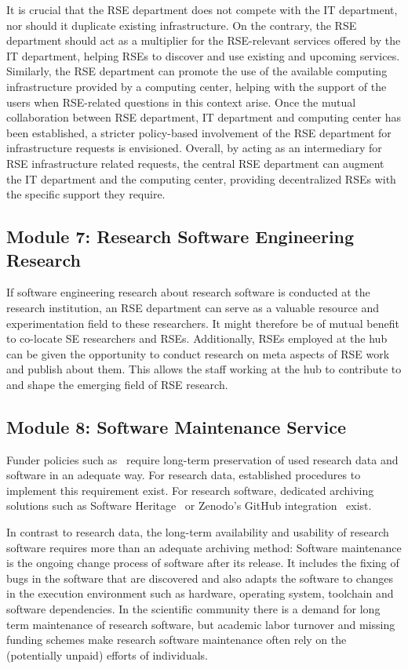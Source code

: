 \documentclass[a4paper]{article}
\begin{document}
It is crucial that the RSE department does not compete with the IT department, nor should it duplicate existing infrastructure.
On the contrary, the RSE department should act as a multiplier for the RSE-relevant services offered by the IT department, helping RSEs to discover and use existing and upcoming services.
Similarly, the RSE department can promote the use of the available computing infrastructure provided by a computing center, helping with the support of the users when RSE-related questions in this context arise.
Once the mutual collaboration between RSE department, IT department and computing center has been established, a stricter policy-based involvement of the RSE department for infrastructure requests is envisioned.
Overall, by acting as an intermediary for RSE infrastructure related requests, the central RSE department can augment the IT department and the computing center, providing decentralized RSEs with the specific support they require.

\subsection{Module 7: Research Software Engineering Research}
\label{sec:rseresearch}

If software engineering research about research software is conducted at the research institution, an RSE department can serve as a valuable resource and experimentation field to these researchers.
It might therefore be of mutual benefit to co-locate SE researchers and RSEs.
Additionally, RSEs employed at the hub can be given the opportunity to conduct research on meta aspects of RSE work and publish about them.
This allows the staff working at the hub to contribute to and shape the emerging field of RSE research.

\subsection{Module 8: Software Maintenance Service}
\label{sec:maintenance}

Funder policies such as~\autocite{dfg_gsp} require long-term preservation of used research data and software in an adequate way.
For research data, established procedures to implement this requirement exist.
For research software, dedicated archiving solutions such as Software Heritage~\autocite{DiCosmo2020,DiCosmo2023} or Zenodo's GitHub integration~\autocite{GitHubZenodo} exist.

In contrast to research data, the long-term availability and usability of research software requires more than an adequate archiving method:
Software maintenance is the ongoing change process of software after its release.
It includes the fixing of bugs in the software that are discovered and also adapts the software to changes in the execution environment such as hardware, operating system, toolchain and software dependencies.
In the scientific community there is a demand for long term maintenance of research software,
but academic labor turnover and missing funding schemes make research software maintenance often rely on the (potentially unpaid) efforts of individuals.
\end{document}
